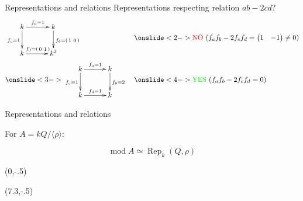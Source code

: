 \documentclass[usenames,dvipsnames]{beamer}
\newcommand{\equivalence}{\simeq}
\DeclareMathOperator{\fmod}{mod}
\DeclareMathOperator{\Rep}{Rep}
\begin{document}
\begin{frame}{Representations and relations}
Representations respecting relation $ab - 2cd$?
\begin{align*}
&
\vcenter{\xymatrix@C=30pt{
k\ar[r]^{f_a = 1}\ar[d]_{f_c = 1} & k\ar[d]^{f_b
  = \left(\begin{smallmatrix} 1 & 0\end{smallmatrix}\right)}\\
k\ar[r]^{f_d = \left(\begin{smallmatrix} 0 & 1\end{smallmatrix}\right)} & k^2
}}
&&
\onslide<2->{
\text{\textcolor{red}{NO}
($f_a f_b - 2 f_c f_d
  = \begin{pmatrix} 1 & -1 \end{pmatrix} \ne 0$)}}
\\
&
\onslide<3->{
\vcenter{\xymatrix@C=30pt{
k\ar[r]^{f_a = 1}\ar[d]_{f_c = 1} & k\ar[d]^{f_b = 2}\\
k\ar[r]^{f_d = 1} & k
}}}
&&
\onslide<4->{
\text{\textcolor{green}{YES}
($f_a f_b - 2 f_c f_d
  = 0$)}}
\end{align*}
\end{frame}

\begin{frame}{Representations and relations}

For $A = kQ/\langle \rho \rangle$:

{\huge
\[
\fmod A \equivalence \Rep_k (Q,\rho)
\]
}
\pause
\begin{textblock}{5}(0,-.5)
\end{textblock}
\pause
\begin{textblock}{5}(7.3,-.5)
\end{textblock}
\end{frame}
\end{document}

